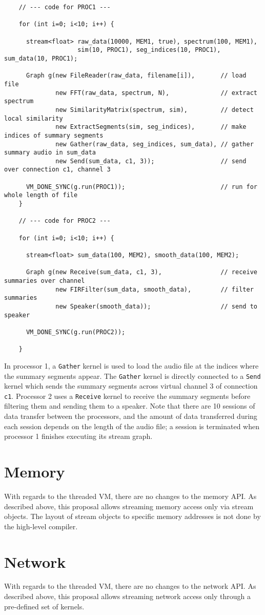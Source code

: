 {\small
\begin{verbatim}
    // --- code for PROC1 ---

    for (int i=0; i<10; i++) {

      stream<float> raw_data(10000, MEM1, true), spectrum(100, MEM1),
                    sim(10, PROC1), seg_indices(10, PROC1), sum_data(10, PROC1);

      Graph g(new FileReader(raw_data, filename[i]),       // load file
              new FFT(raw_data, spectrum, N),              // extract spectrum
              new SimilarityMatrix(spectrum, sim),         // detect local similarity
              new ExtractSegments(sim, seg_indices),       // make indices of summary segments
              new Gather(raw_data, seg_indices, sum_data), // gather summary audio in sum_data
              new Send(sum_data, c1, 3));                  // send over connection c1, channel 3

      VM_DONE_SYNC(g.run(PROC1));                          // run for whole length of file
    }

    // --- code for PROC2 ---

    for (int i=0; i<10; i++) {

      stream<float> sum_data(100, MEM2), smooth_data(100, MEM2);

      Graph g(new Receive(sum_data, c1, 3),                // receive summaries over channel
              new FIRFilter(sum_data, smooth_data),        // filter summaries
              new Speaker(smooth_data));                   // send to speaker

      VM_DONE_SYNC(g.run(PROC2));

    }   
\end{verbatim}}
In processor 1, a {\tt Gather} kernel is used to load the audio file
at the indices where the summary segments appear.  The {\tt Gather}
kernel is directly connected to a {\tt Send} kernel which sends the
summary segments across virtual channel 3 of connection {\tt c1}.
Processor 2 uses a {\tt Receive} kernel to receive the summary
segments before filtering them and sending them to a speaker.  Note
that there are 10 sessions of data transfer between the processors,
and the amount of data transferred during each session depends on the
length of the audio file; a session is terminated when processor 1
finishes executing its stream graph.

\section{Memory}

With regards to the threaded VM, there are no changes to the memory
API.  As described above, this proposal allows streaming memory access
only via stream objects.  The layout of stream objects to specific
memory addresses is not done by the high-level compiler.

\section{Network}

With regards to the threaded VM, there are no changes to the network
API. As described above, this proposal allows streaming network access
only through a pre-defined set of kernels.
